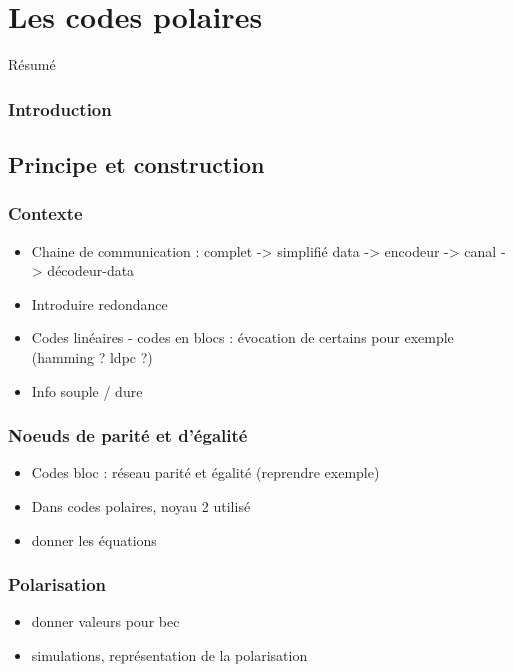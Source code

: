 
\chapter{Les codes polaires}

Résumé

\vspace*{\fill}
\minitocTITI
\vspace*{\fill}

\subsection*{Introduction}

\section{Principe et construction}

\subsection{Contexte}
\begin{itemize}
\item Chaine de communication : complet -> simplifié data -> encodeur -> canal -> décodeur-data
\item Introduire redondance
\item Codes linéaires - codes en blocs : évocation de certains pour exemple (hamming ? ldpc ?)
\item Info souple / dure

\end{itemize}
\subsection{Noeuds de parité et d'égalité}
\begin{itemize}
\item Codes bloc : réseau parité et égalité (reprendre exemple)
\item Dans codes polaires, noyau 2 utilisé
\item donner les équations
\end{itemize}
\subsection{Polarisation}
\begin{itemize}
\item donner valeurs pour bec
\item simulations, représentation de la polarisation
\end{itemize}
